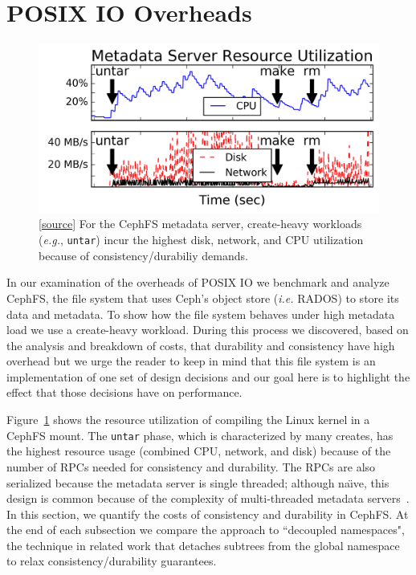 \section{POSIX IO Overheads}
\label{sec:posix-overheads}

\begin{figure}[tb] \centering
\includegraphics[width=1\linewidth]{./graphs/overhead-creates.png}
\caption{[\href{https://github.com/michaelsevilla/cudele-popper/blob/revision/experiments/baseline-compile/visualize/viz.ipynb}{source}]
For the CephFS metadata server, create-heavy workloads ({\it e.g.},
\texttt{untar}) incur the highest disk, network, and CPU utilization because of
consistency/durabiliy demands.}\label{fig:overhead-creates}
\end{figure}

In our examination of the overheads of POSIX IO we benchmark and analyze
CephFS, the file system that uses Ceph's object store ({\it i.e.} RADOS) to
store its data and metadata.  To show how
the file system behaves under high metadata load we use a create-heavy
workload.  During this process we discovered, based on the analysis and
breakdown of costs, that durability and consistency have high overhead but we
urge the reader to keep in mind that this file system is an implementation of
one set of design decisions and our goal here is to highlight the effect that
those decisions have on performance.

Figure~\ref{fig:overhead-creates} shows the resource utilization of compiling
the Linux kernel in a CephFS mount.  The \texttt{untar} phase, which is
characterized by many creates, has the highest resource usage (combined CPU,
network, and disk) because of the number of RPCs needed for consistency and
durability. The RPCs are also serialized because the metadata server is single
threaded; although na\"{\i}ve, this design is common because of the complexity
of multi-threaded metadata
servers~\cite{konstantinos:pdsw2014-lustre-metadata}.  In this section, we
quantify the costs of consistency and durability in CephFS.  At the end of each
subsection we compare the approach to ``decoupled namespaces", the technique in
related work that detaches subtrees from the global namespace to relax
consistency/durability guarantees. 

